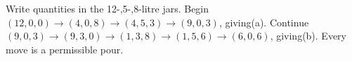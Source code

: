 Write quantities in the 12-,5-,8-litre jars. Begin $(12,0,0)\to(4,0,8)\to(4,5,3)\to(9,0,3)$, giving(a). Continue $(9,0,3)\to(9,3,0)\to(1,3,8)\to(1,5,6)\to(6,0,6)$, giving(b). Every move is a permissible pour.

